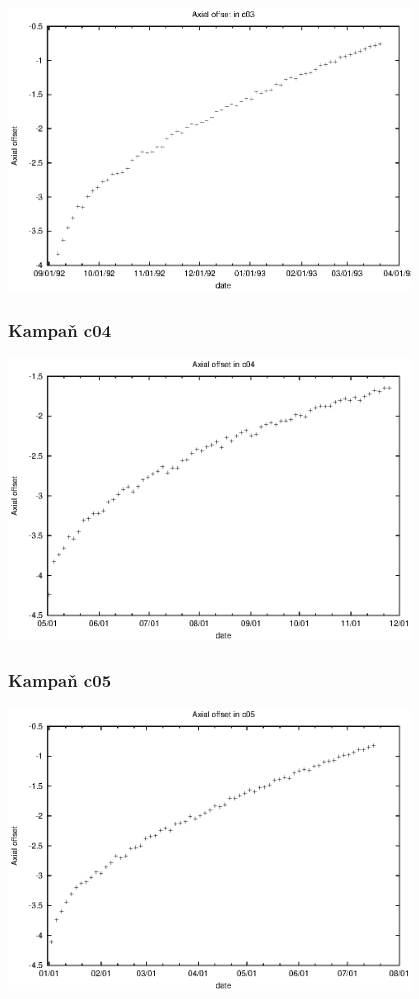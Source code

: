 \documentclass[a4paper,twoside,11pt]{article}
\begin{document}
\includegraphics[width=0.8\textwidth]{data_c03_ao.eps}


\subsubsection{Kampaň c04}

\includegraphics[width=0.8\textwidth]{data_c04_ao.eps}


\subsubsection{Kampaň c05}

\includegraphics[width=0.8\textwidth]{data_c05_ao.eps}
\end{document}

